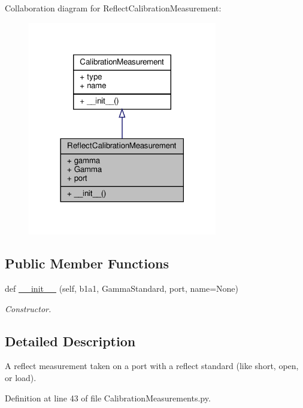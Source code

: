 Collaboration diagram for Reflect\+Calibration\+Measurement\+:\nopagebreak
\begin{figure}[H]
\begin{center}
\leavevmode
\includegraphics[width=234pt]{classSignalIntegrity_1_1Measurement_1_1Calibration_1_1CalibrationMeasurements_1_1ReflectCalibrationMeasurement__coll__graph}
\end{center}
\end{figure}
\subsection*{Public Member Functions}
\begin{DoxyCompactItemize}
\item 
def \hyperlink{classSignalIntegrity_1_1Measurement_1_1Calibration_1_1CalibrationMeasurements_1_1ReflectCalibrationMeasurement_ac27eb7fe360b81f719eaa4870978bde1}{\+\_\+\+\_\+init\+\_\+\+\_\+} (self, b1a1, Gamma\+Standard, port, name=None)
\begin{DoxyCompactList}\small\item\em Constructor. \end{DoxyCompactList}\end{DoxyCompactItemize}


\subsection{Detailed Description}
A reflect measurement taken on a port with a reflect standard (like short, open, or load). 



Definition at line 43 of file Calibration\+Measurements.\+py.



